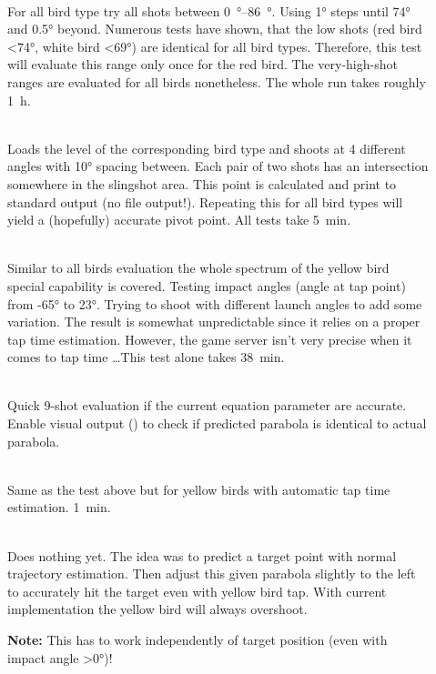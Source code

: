 \begin{description}
	\item[]$~$\\
	For all bird type try all shots between \SIrange{0}{86}{\degree}. Using \ang{1} steps until \ang{74} and \ang{0.5} beyond. Numerous tests have shown, that the low shots (red bird \ang{<74}, white bird \ang{<69}) are identical for all bird types. Therefore, this test will evaluate this range only once for the red bird. The very-high-shot ranges are evaluated for all birds nonetheless. The whole run takes roughly \SI{1}{\hour}.
	
	\item[]$~$\\
	Loads the level of the corresponding bird type and shoots at \num{4} different angles with \ang{10} spacing between. Each pair of two shots has an intersection somewhere in the slingshot area. This point is calculated and print to standard output (no file output!). Repeating this for all bird types will yield a (hopefully) accurate pivot point. All tests take \SI{5}{\minute}.
	
	\item[]$~$\\
	Similar to all birds evaluation the whole spectrum of the yellow bird special capability is covered. Testing impact angles (angle at tap point) from \ang{-65} to \ang{23}. Trying to shoot with different launch angles to add some variation. The result is somewhat unpredictable since it relies on a proper tap time estimation. However, the game server isn't very precise when it comes to tap time \dots This test alone takes \SI{38}{\minute}.
	
	\item[]$~$\\
	Quick \num{9}-shot evaluation if the current equation parameter are accurate. Enable visual output () to check if predicted parabola is identical to actual parabola.
	
	\item[]$~$\\
	Same as the test above but for yellow birds with automatic tap time estimation. \SI{1}{\minute}.
	
	\item[]$~$\\
	Does nothing yet. The idea was to predict a target point with normal trajectory estimation. Then adjust this given parabola slightly to the left to accurately hit the target even with yellow bird tap. With current implementation the yellow bird will always overshoot. 
	
	\textbf{Note:} This has to work independently of target position (even with impact angle \ang{>0})!
\end{description}




